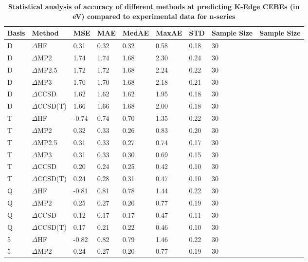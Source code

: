 \begin{table}
  \caption{\textbf{Statistical analysis of accuracy of different methods at predicting K-Edge CEBEs (in eV) compared to experimental data for n-series}}
  \label{tbl:summary-n}
  \begin{tabular}{l l l l l l l l l }
    \hline
    \textbf{Basis} & \textbf{Method} & \textbf{MSE} & \textbf{MAE} & \textbf{MedAE} & \textbf{MaxAE} & \textbf{STD} & \textbf{Sample Size} & \textbf{Sample Size} \\ 
    \hline
    D & $\Delta$HF & 0.31 & 0.32 & 0.32 & 0.58 & 0.18 & 30 \\ 
    D & $\Delta$MP2 & 1.74 & 1.74 & 1.68 & 2.30 & 0.24 & 30 \\ 
    D & $\Delta$MP2.5 & 1.72 & 1.72 & 1.68 & 2.24 & 0.22 & 30 \\ 
    D & $\Delta$MP3 & 1.70 & 1.70 & 1.68 & 2.18 & 0.21 & 30 \\ 
    D & $\Delta$CCSD & 1.62 & 1.62 & 1.62 & 1.95 & 0.18 & 30 \\ 
    D & $\Delta$CCSD(T) & 1.66 & 1.66 & 1.68 & 2.00 & 0.18 & 30 \\ 
    T & $\Delta$HF & -0.74 & 0.74 & 0.70 & 1.35 & 0.22 & 30 \\ 
    T & $\Delta$MP2 & 0.32 & 0.33 & 0.26 & 0.83 & 0.20 & 30 \\ 
    T & $\Delta$MP2.5 & 0.31 & 0.33 & 0.27 & 0.74 & 0.17 & 30 \\ 
    T & $\Delta$MP3 & 0.31 & 0.33 & 0.30 & 0.69 & 0.15 & 30 \\ 
    T & $\Delta$CCSD & 0.20 & 0.24 & 0.25 & 0.42 & 0.10 & 30 \\ 
    T & $\Delta$CCSD(T) & 0.24 & 0.28 & 0.31 & 0.47 & 0.10 & 30 \\ 
    Q & $\Delta$HF & -0.81 & 0.81 & 0.78 & 1.44 & 0.22 & 30 \\ 
    Q & $\Delta$MP2 & 0.25 & 0.27 & 0.20 & 0.77 & 0.19 & 30 \\ 
    Q & $\Delta$CCSD & 0.12 & 0.17 & 0.17 & 0.47 & 0.11 & 30 \\ 
    Q & $\Delta$CCSD(T) & 0.17 & 0.21 & 0.22 & 0.46 & 0.10 & 30 \\ 
    5 & $\Delta$HF & -0.82 & 0.82 & 0.79 & 1.46 & 0.22 & 30 \\ 
    5 & $\Delta$MP2 & 0.24 & 0.27 & 0.20 & 0.77 & 0.19 & 30 \\ 
    \hline
  \end{tabular}
\end{table}
